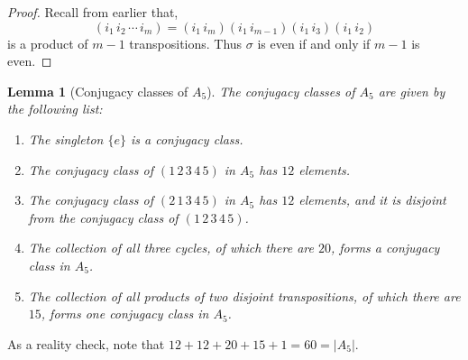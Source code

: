 \documentclass[12pt]{report}
\newtheorem{lemma}[theorem]{Lemma}
\numberwithin{equation}{section}
\numberwithin{theorem}{chapter}
\theoremstyle{definition}
\newtheorem*{basic properties}{Basic Properties}
\newtheorem*{Important Remark}{Important Remark}
\begin{document}
\begin{proof}
Recall from earlier that,
$$(i_1 \, i_2 \, \cdots \, i_m) = (i_1 \, i_m) (i_1 \, i_{m-1}) (i_1 \, i_3) (i_1 \, i_2)$$
is a product of $m-1$ transpositions.
Thus $\sigma$ is even if and only if $m-1$ is even.
\end{proof}


\begin{lemma}[Conjugacy classes of $A_5$]\label{conjugacy classes of A5}
The conjugacy classes of $A_5$ are given by the following list:
\begin{enumerate}[itemsep=-0.1em]
\item The singleton $\{e\}$ is a conjugacy class.
\item The conjugacy class of $(1 \, 2 \, 3 \, 4 \, 5)$ in $A_5$ has $12$ elements.
\item The conjugacy class of $(2 \, 1 \, 3 \, 4 \, 5)$ in $A_5$ has $12$ elements, and it is disjoint from the conjugacy class of $(1 \, 2 \, 3 \, 4 \, 5)$. 
\item The collection of all three cycles, of which there are $20$, forms a conjugacy class in $A_5$.
\item The collection of all products of two disjoint transpositions, of which there are $15$, forms one conjugacy class in $A_5$.
\end{enumerate}
\end{lemma}


As a reality check, note that $12 + 12 + 20 + 15 + 1 = 60 = |A_5|$.
\end{document}
